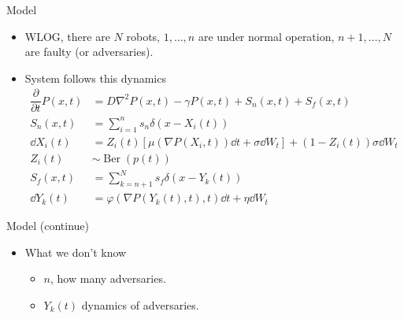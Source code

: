 \documentclass[10pt]{beamer}
\begin{document}
  \begin{frame}{Model}
    \begin{itemize}
      \item WLOG, there are $N$ robots, $1,\dots, n$ are under normal operation, $n+1, \dots, N$ are faulty (or adversaries).
      \item System follows this dynamics
        \begin{align*}
          \dfrac{\partial}{\partial t} P(x,t) &= D\nabla^2 P(x,t) - \gamma P(x,t) + S_n(x,t)+ S_f(x,t)\\
          S_n(x,t) &= \sum_{i=1}^{n}s_n\delta(x-X_i(t))\\
          \dd X_i(t) &= Z_i(t)\left[\mu(\nabla P(X_i,t))\dd t + \sigma \dd W_t\right] + (1-Z_i(t))\sigma\dd W_t\\
          Z_i(t) &\sim \operatorname{Ber}(p(t))\\
          S_f(x,t) &= \sum_{k=n+1}^N s_f \delta(x-Y_k(t))\\
          \dd Y_k(t) &= \varphi(\nabla P(Y_k(t),t),t)\dd t + \eta \dd W_t
        \end{align*}
    \end{itemize}
  \end{frame}
  \begin{frame}{Model (continue)}
  \begin{itemize}
  \item What we don't know
        \begin{itemize}
          \item $n$, how many adversaries.
          \item $Y_k(t)$ dynamics of adversaries.
        \end{itemize}
  \end{itemize}
  \end{frame}
\end{document}
